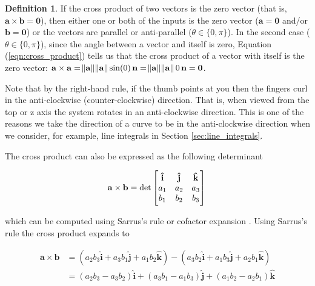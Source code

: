 \documentclass{article}
\theoremstyle{definition}
\newtheorem{definition}{Definition}[section]
\begin{document}
\begin{definition}
\medskip
\bigskip
\noindent
If the cross product of two vectors is the zero vector (that is,
$\mathbf{a \times b} = \mathbf{0}$), then either one or both of
the inputs is the zero vector ($\mathbf{a} = \mathbf{0}$ and/or
$\mathbf{b} = \mathbf{0}$) or the vectors are parallel or
anti-parallel ($\theta \in \{0, \pi\}$).  In the second case
($\theta \in \{0, \pi\}$), since the angle between a vector and
itself is zero, Equation (\ref{eqn:cross_product}) tells us that
the cross product of a vector with itself is the zero vector:
$\mathbf{a} \times \mathbf{a} = \norm{\mathbf{a}} 
\norm{\mathbf{a}}  \sin (0) \, \mathbf{n} = \norm{\mathbf{a}} 
 \norm{\mathbf{a}} 0 \, \mathbf{n} = \mathbf{0}$.



\bigskip
\noindent
Note that by the right-hand rule, if the thumb
points at you then the fingers curl in the
anti-clockwise (counter-clockwise) direction. 
That is, when viewed from the top or z 
axis the system rotates in an anti-clockwise
direction. This is one of the reasons we take 
the direction of a curve to be in the anti-clockwise 
direction when we consider, for example, line integrals
in Section \ref{sec:line_integrals}.



\bigskip
\noindent
The cross product can also be expressed as the following
determinant


\bigskip
\begin{equation*}
\mathbf {a\times b} 
= \det \begin{bmatrix}
    \mathbf{\hat{i}} & \mathbf{\hat{j}} & \mathbf{\hat{k}} \\
    a_{1} & a_{2} &a_{3} \\
    b_{1} & b_{2} &b_{3}
  \end{bmatrix} \\
\end{equation*}

\bigskip
\noindent
which can be computed using Sarrus's rule
\cite{wiki:rule_of_sarrus} or cofactor expansion
\cite{cofactor_expansion}. Using Sarrus's rule the cross product
expands to

\bigskip
\begin{equation*}
\begin{aligned}
\mathbf{a\times b} 
&= (a_{2} b_{3} \mathbf{\hat{i}} + a_{3}b_{1} \mathbf{\hat{j}} + a_{1}b_{2} \mathbf{\hat{k}})
-  (a_{3}b_{2}\mathbf{\hat{i}} + a_{1}b_{3}\mathbf{\hat{j}} + a_{2}b_{1}\mathbf{\hat{k}}) \\
&= (a_{2}b_{3} - a_{3}b_{2}) \mathbf{\hat{i}} + ( a_{3}b_{1} - a_{1}b_{3})
\mathbf{\hat{j}} + ( a_{1}b_{2} - a_{2}b_{1} ) \mathbf{\hat{k}} 
\end{aligned}
\end{equation*}


\end{definition}
\end{document}
